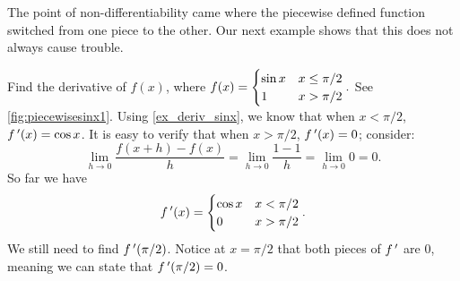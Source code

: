 The point of non-differentiability came where the piecewise defined function switched from one piece to the other. Our next example shows that this does not always cause trouble.\bigskip

\begin{example}\label{ex_diff_piecewise}%
Find the derivative of $f(x)$, where $\displaystyle f(x) = \begin{cases}\sin x & x\leq \pi/2 \\ 1 & x>\pi/2 \end{cases}.$ See \autoref{fig:piecewisesinx1}.
\solution
Using \autoref{ex_deriv_sinx}, we know that when $x<\pi/2$, $f\,'(x) = \cos x$. It is easy to verify that when $x>\pi/2$, $f\,'(x) = 0$; consider:
%
%
\[
 \lim_{h\to0}\frac{f(x+h) - f(x)}{h}
 = \lim_{h\to0}\frac{1-1}{h} = \lim_{h\to0}0 =0.
\]
%
So far we have
\[f\,'(x) = \begin{cases}\cos x & x<\pi/2\\ 0 & x>\pi/2\end{cases}.\]
We still need to find $f\,'(\pi/2)$. Notice at $x=\pi/2$ that both pieces of $f\,'$ are 0, meaning we can state that $f\,'(\pi/2)=0$. 


\end{example}
